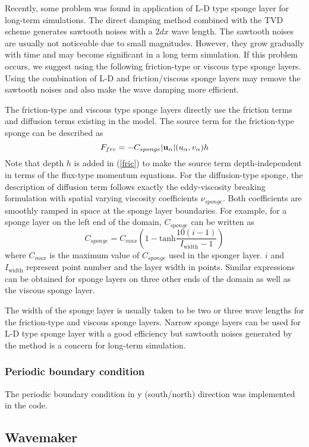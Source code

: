 \documentclass[11pt]{article}
\newcommand{\be}{\begin{equation}}
\newcommand{\ee}{\end{equation}}
\begin{document}
Recently, some problem was found in application of L-D type sponge layer for long-term simulations. 
 The direct damping method combined with the TVD scheme  generates sawtooth noises with a $2 dx$ wave length. The sawtooth noises are usually not noticeable due to small magnitudes. However, they grow gradually with time and may become significant in a long term simulation. If this problem occurs, we suggest using the following friction-type or viscous type sponge layers. Using the combination of L-D and friction/viscous sponge layers may remove the sawtooth noises and also make the wave damping more efficient. 
 
The friction-type and viscous type sponge layers directly use the friction terms and diffusion terms existing in the model. The source term for the friction-type sponge can be described as
\be
  F_{frc} = - C_{sponge} |{\bf u_\alpha}|  (u_\alpha, v_\alpha) h
  \label{fric}
\ee
Note that depth $h$ is added in (\ref{fric}) to make the source term depth-independent in terms of the flux-type momentum equations. For the diffusion-type sponge, the description of diffusion term follows exactly the eddy-viscosity breaking formulation with spatial varying viscosity coefficients $\nu_{sponge}$. 
 Both coefficients are smoothly ramped in space at the sponge layer boundaries. For example, 
for a sponge layer on the left end of the domain,  $C_{sponge}$ can be written as
\be
C_{sponge} = C_{max} \left (1-  \mbox{tanh} \frac{10 (i-1)}{I_{\mbox{width}}-1} \right)
\ee
where $C_{max}$ is the maximum value of $C_{sponge}$ used in the sponger layer. $i$ and $I_{\mbox{width}}$ represent point number and the layer width in points. Similar expressions can be obtained for sponge layers on three other ends of the domain as well as  the viscous sponge layer. 
 
The width of the sponge layer is usually taken to be two or three wave lengths for the friction-type and viscous sponge layers. Narrow sponge layers can be used for L-D type sponge layer with a good efficiency but sawtooth noises generated by the method is a concern for long-term simulation. 


\subsubsection{Periodic boundary condition}

The periodic boundary condition in y (south/north) direction was implemented in the  code. 

\subsection{Wavemaker}
\end{document}
